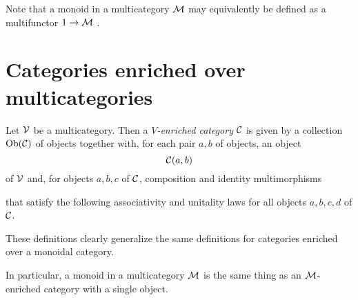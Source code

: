 Note that a monoid in a multicategory $\mathcal M$ may equivalently be defined as a multifunctor $1 \to \mathcal M$ \cite[2.1.11]{Multicategories}.

\section{Categories enriched over multicategories}

\begin{definition}
  \label{DefEnrichedCategoryMulticategory}
  Let ${\mathcal{V}}$ be a multicategory.  
  Then a \emph{$V$-enriched category} ${\mathcal{C}}$ is given by a collection $\text{Ob}({\mathcal{C}})$ of objects together with, for each pair $a,b$ of objects, an object
  \[
    {\mathcal{C}}(a,b)
    \]
  of ${\mathcal{V}}$ and, for objects $a,b,c$ of ${\mathcal{C}}$, composition and identity multimorphisms
  that satisfy the following associativity and unitality laws for all objects $a,b,c,d$ of ${\mathcal{C}}$.
\end{definition}

\begin{remark}
  These definitions clearly generalize the same definitions for categories enriched over a monoidal category.

  In particular, a monoid in a multicategory $\mathcal M$ is the same thing as an $\mathcal M$-enriched category with a single object.
\end{remark}

